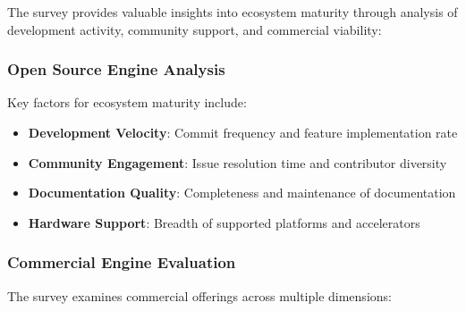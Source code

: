 \documentclass[12pt,a4paper]{article}
\begin{document}
The survey provides valuable insights into ecosystem maturity through analysis of development activity, community support, and commercial viability:

\subsubsection{Open Source Engine Analysis}

Key factors for ecosystem maturity include:

\begin{itemize}
    \item \textbf{Development Velocity}: Commit frequency and feature implementation rate
    \item \textbf{Community Engagement}: Issue resolution time and contributor diversity
    \item \textbf{Documentation Quality}: Completeness and maintenance of documentation
    \item \textbf{Hardware Support}: Breadth of supported platforms and accelerators
\end{itemize}

\subsubsection{Commercial Engine Evaluation}

The survey examines commercial offerings across multiple dimensions:

\begin{table}[htbp]
\centering
\caption{Commercial Inference Engine Comparison}
\label{tab:commercial_engines}
\end{table}
\end{document}
